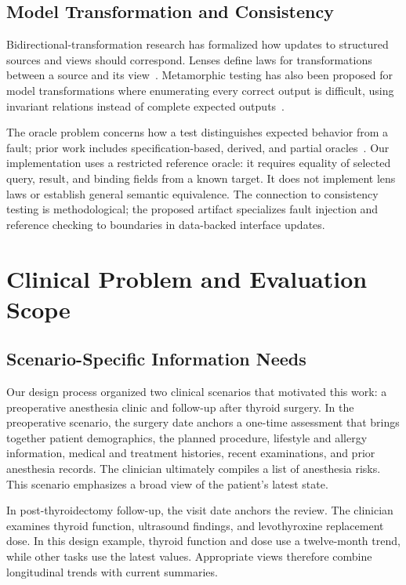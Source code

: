 \documentclass[manuscript,review,anonymous]{acmart}
\begin{document}
\subsection{Model Transformation and Consistency}

Bidirectional-transformation research has formalized how updates to structured sources and views should correspond. Lenses define laws for transformations between a source and its view~\cite{foster2007lenses}. Metamorphic testing has also been proposed for model transformations where enumerating every correct output is difficult, using invariant relations instead of complete expected outputs~\cite{he2018metamorphic}.

The oracle problem concerns how a test distinguishes expected behavior from a fault; prior work includes specification-based, derived, and partial oracles~\cite{barr2015oracle}. Our implementation uses a restricted reference oracle: it requires equality of selected query, result, and binding fields from a known target. It does not implement lens laws or establish general semantic equivalence. The connection to consistency testing is methodological; the proposed artifact specializes fault injection and reference checking to boundaries in data-backed interface updates.

\section{Clinical Problem and Evaluation Scope}

\subsection{Scenario-Specific Information Needs}

Our design process organized two clinical scenarios that motivated this work: a preoperative anesthesia clinic and follow-up after thyroid surgery. In the preoperative scenario, the surgery date anchors a one-time assessment that brings together patient demographics, the planned procedure, lifestyle and allergy information, medical and treatment histories, recent examinations, and prior anesthesia records. The clinician ultimately compiles a list of anesthesia risks. This scenario emphasizes a broad view of the patient's latest state.

In post-thyroidectomy follow-up, the visit date anchors the review. The clinician examines thyroid function, ultrasound findings, and levothyroxine replacement dose. In this design example, thyroid function and dose use a twelve-month trend, while other tasks use the latest values. Appropriate views therefore combine longitudinal trends with current summaries.
\end{document}
